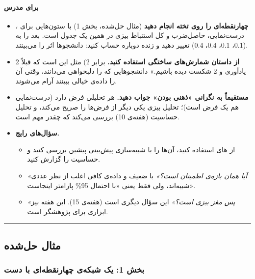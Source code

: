 \paragraph{برای مدرس}

\begin{itemize}
\tightlist
\item
  \textbf{ چهارنقطه‌ای را روی تخته انجام دهید} (مثال حل‌شده، بخش
  1) با ستون‌هایی برای ، درست‌نمایی، حاصل‌ضرب و 
  کل استنباط بیزی در همین یک جدول است. بعد  را به (0.1، 0.1،
  0.4، 0.4) تغییر دهید و زنده دوباره حساب کنید: دانشجوها اثر 
  را می‌بینند.
\item
  \textbf{از داستان شمارش‌های ساختگی  استفاده کنید.} 
  برابر  2) مثل این است که قبلاً 2 یادآوری و 2 شکست دیده
  باشیم.» دانشجوهایی که  را دلبخواهی می‌دانند، وقتی آن را داده‌ی
  خیالی ببینند آرام می‌شوند.
\item
  \textbf{مستقیماً به نگرانی «ذهنی بودن» جواب دهید.} هر تحلیلی فرض دارد
  (درست‌نمایی هم یک فرض است)؛ تحلیل بیزی یکی دیگر از فرض‌ها را صریح می‌کند،
  و تحلیل حساسیت (هفته‌ی 10) بررسی می‌کند که چقدر مهم است.
\item
  \textbf{سؤال‌های رایج.}

  \begin{itemize}
  \tightlist
  \item
    از های  استفاده کنید، آن‌ها را با
    شبیه‌سازی پیش‌بینی پیشین بررسی کنید و حساسیت را گزارش کنید.
  \item
    \emph{«آیا  همان بازه‌ی اطمینان است؟»} با
     ضعیف و داده‌ی کافی اغلب از نظر عددی شبیه‌اند، ولی فقط
     یعنی «با احتمال 95\% پارامتر اینجاست».
  \item
    \emph{«پس مغز بیزی است؟»} این سؤال دیگری است (هفته‌ی 15). این هفته
    بیز ابزاری برای پژوهشگر است.
  \end{itemize}
\end{itemize}

\begin{center}\rule{0.5\linewidth}{0.5pt}\end{center}


\subsection{مثال حل‌شده}

\subsubsection{بخش 1: یک شبکه‌ی چهارنقطه‌ای با دست}

